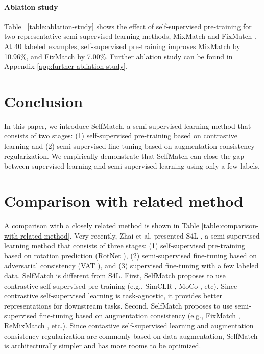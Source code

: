 \documentclass{article}
\begin{document}
\paragraph{Ablation study}
Table ~\ref{table:ablation-study} shows the effect of self-supervised pre-training for two representative semi-supervised learning methods, MixMatch \cite{berthelot2019mixmatch} and FixMatch \cite{sohn2020fixmatch}. At 40 labeled examples, self-supervised pre-training improves MixMatch by 10.96\%, and FixMatch by 7.00\%. Further ablation study can be found in Appendix \ref{app:further-abliation-study}. \section{Conclusion}
\label{section:conclusion}

In this paper, we introduce SelfMatch, a semi-supervised learning method that consists of two stages: (1) self-supervised pre-training based on contrastive learning and (2) semi-supervised fine-tuning based on augmentation consistency regularization. We empirically demonstrate that SelfMatch can close the gap between supervised learning and semi-supervised learning using only a few labels. 
\medskip
\small


\normalsize
\appendix
\newpage
\section{Comparison with related method}
\label{app:comparison-with-related-methods}

A comparison with a closely related method is shown in Table \ref{table:comparison-with-related-method}. Very recently, Zhai et al. presented S4L \cite{zhai2019s4l}, a semi-supervised learning method that consists of three stages: (1) self-supervised pre-training based on rotation prediction (RotNet \cite{gidaris2018unsupervised}), (2) semi-supervised fine-tuning based on adversarial consistency (VAT \cite{miyato2018virtual}), and (3) supervised fine-tuning with a few labeled data. SelfMatch is different from S4L. First, SelfMatch proposes to use contrastive self-supervised pre-training (e.g., SimCLR \cite{chen2020simple}, MoCo \cite{he2020momentum}, etc). Since contrastive self-supervised learning is task-agnostic, it provides better representations for downstream tasks. Second, SelfMatch proposes to use semi-supervised fine-tuning based on augmentation consistency (e.g., FixMatch \cite{sohn2020fixmatch}, ReMixMatch \cite{berthelot2020remixmatch}, etc.). Since contastive self-supervised learning and augmentation consistency regularization are commonly based on data augmentation, SelfMatch is architecturally simpler and has more rooms to be optimized.
\end{document}
